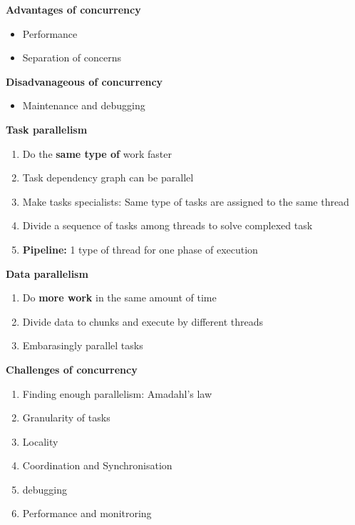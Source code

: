 \documentclass[10pt, landscape]{article}
\begin{document}
\begin{multicols}{4}
\textbf{Advantages of concurrency} \\ 
\begin{itemize}
    \item Performance
    \item Separation of concerns
\end{itemize}

\textbf{Disadvanageous of concurrency} \\ 
\begin{itemize}
    \item Maintenance and debugging
\end{itemize}

\textbf{Task parallelism} \\ 
\begin{enumerate}
    \item Do the \textbf{same type of} work faster
    \item Task dependency graph can be parallel
    \item Make tasks specialists: Same type of tasks are assigned to the same thread
    \item Divide a sequence of tasks among threads to solve complexed task 
    \item \textbf{Pipeline:} 1 type of thread for one phase of execution
\end{enumerate}

\textbf{Data parallelism} \\ 
\begin{enumerate}
    \item Do \textbf{more work} in the same amount of time
    \item Divide data to chunks and execute by different threads
    \item Embarasingly parallel tasks
\end{enumerate}

\textbf{Challenges of concurrency} \\
\begin{enumerate}
    \item Finding enough parallelism: Amadahl's law
    \item Granularity of tasks
    \item Locality
    \item Coordination and Synchronisation
    \item debugging
    \item Performance and monitroring
\end{enumerate}


\end{multicols}
\end{document}
